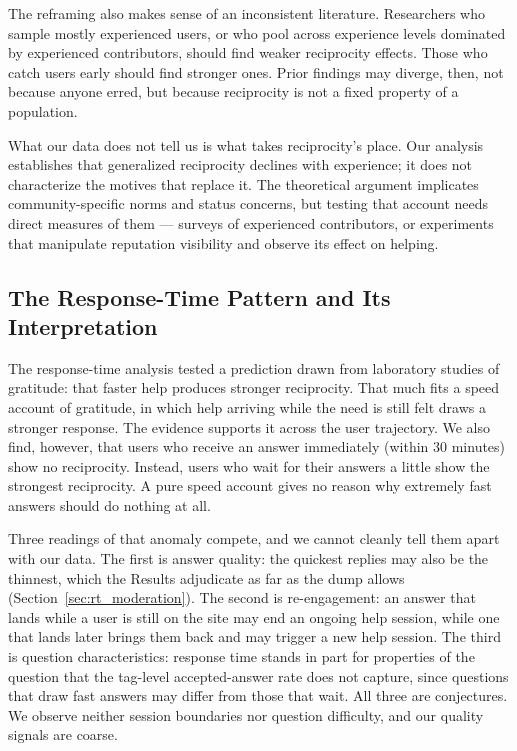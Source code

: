 The reframing also makes sense of an inconsistent literature. Researchers who sample mostly experienced users, or who pool across experience levels dominated by experienced contributors, should find weaker reciprocity effects. Those who catch users early should find stronger ones. Prior findings may diverge, then, not because anyone erred, but because reciprocity is not a fixed property of a population.

What our data does not tell us is what takes reciprocity's place. Our analysis establishes that generalized reciprocity declines with experience; it does not characterize the motives that replace it. The theoretical argument implicates community-specific norms and status concerns, but testing that account needs direct measures of them --- surveys of experienced contributors, or experiments that manipulate reputation visibility and observe its effect on helping.

\subsection{The Response-Time Pattern and Its Interpretation}
\label{sec:rt_discussion}

The response-time analysis tested a prediction drawn from laboratory studies of gratitude: that faster help produces stronger reciprocity. That much fits a speed account of gratitude, in which help arriving while the need is still felt draws a stronger response. The evidence supports it across the user trajectory. We also find, however, that users who receive an answer immediately (within 30 minutes) show no reciprocity. Instead, users who wait for their answers a little show the strongest reciprocity. A pure speed account gives no reason why extremely fast answers should do nothing at all.

Three readings of that anomaly compete, and we cannot cleanly tell them apart with our data. The first is answer quality: the quickest replies may also be the thinnest, which the Results adjudicate as far as the dump allows (Section~\ref{sec:rt_moderation}). The second is re-engagement: an answer that lands while a user is still on the site may end an ongoing help session, while one that lands later brings them back and may trigger a new help session. The third is question characteristics: response time stands in part for properties of the question that the tag-level accepted-answer rate does not capture, since questions that draw fast answers may differ from those that wait. All three are conjectures. We observe neither session boundaries nor question difficulty, and our quality signals are coarse.

